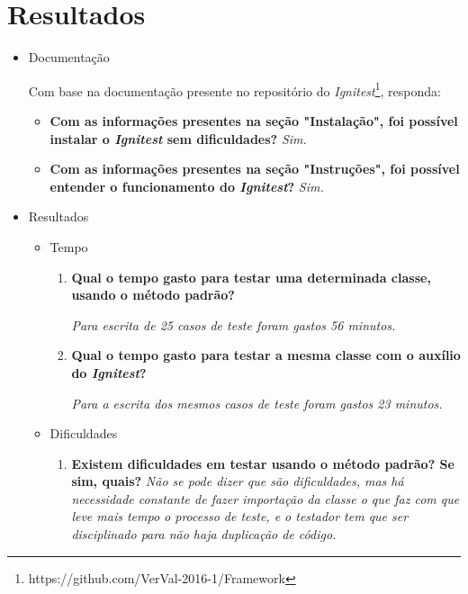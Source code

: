 \chapter{Resultados}
    
    \begin{itemize}
        \item Documentação
        
            Com base na documentação presente no repositório do \textit{Ignitest}\footnote{https://github.com/VerVal-2016-1/Framework}, responda:
            \begin{itemize}
                \item \textbf{Com as informações presentes na seção "Instalação", foi possível instalar o \textit{Ignitest} sem dificuldades?}
                    \subitem \textit{Sim.}

                \item \textbf{Com as informações presentes na seção "Instruções", foi possível entender o funcionamento do \textit{Ignitest}?}
                    \subitem \textit{Sim.}
            \end{itemize}

        \item Resultados
            \begin{itemize}
                \item Tempo
                    \begin{enumerate}
                        \item \textbf{Qual o tempo gasto para testar uma determinada classe, usando o método padrão?}

                            \subitem \textit{Para escrita de 25 casos de teste foram gastos 56 minutos.}              
              
                        \item \textbf{Qual o tempo gasto para testar a mesma classe com o auxílio do \textit{Ignitest}?}
              
                            \subitem \textit{Para a escrita dos mesmos casos de teste foram gastos 23 minutos.}
                        
                    \end{enumerate}
                \item Dificuldades
                    \begin{enumerate}
                        \item \textbf{Existem dificuldades em testar usando o método padrão? Se sim, quais?}
                            \subitem \textit{Não se pode dizer que são dificuldades, mas há necessidade constante de fazer importação da classe o que faz com que leve mais tempo o processo de teste, e o testador tem que ser disciplinado para não haja duplicação de código.}


\end{enumerate}
\end{itemize}
\end{itemize}
